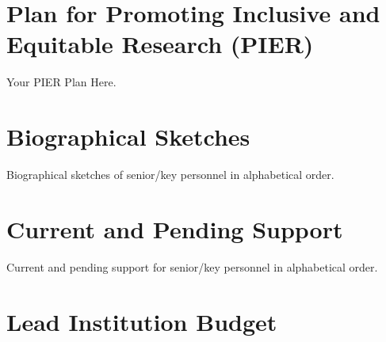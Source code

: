 \documentclass[11pt]{article}
\begin{document}
\section{Plan for Promoting Inclusive and Equitable Research (PIER)}
\label{sec:pier}

Your PIER Plan Here.

\newpage
\section{Biographical Sketches}

Biographical sketches of senior/key personnel in alphabetical order.


%
%

\newpage
\section{Current and Pending Support}

Current and pending support for senior/key personnel in alphabetical order.


%
%



\newpage
\section{Lead Institution Budget}
\end{document}

